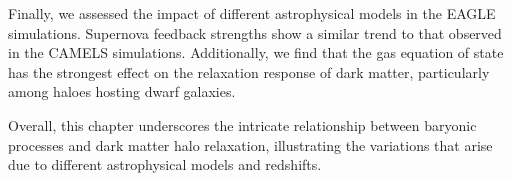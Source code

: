 Finally, we assessed the impact of different astrophysical models in the EAGLE simulations. Supernova feedback strengths show a similar trend to that observed in the CAMELS simulations. Additionally, we find that the gas equation of state has the strongest effect on the relaxation response of dark matter, particularly among haloes hosting dwarf galaxies.

Overall, this chapter underscores the intricate relationship between baryonic processes and dark matter halo relaxation, illustrating the variations that arise due to different astrophysical models and redshifts.